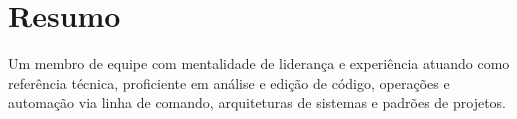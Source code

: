 \section{Resumo}
\vspace{.5em}

Um membro de equipe com mentalidade de liderança e experiência atuando como referência técnica, proficiente em análise e edição de código, operações e automação via linha de comando, arquiteturas de sistemas e padrões de projetos.


